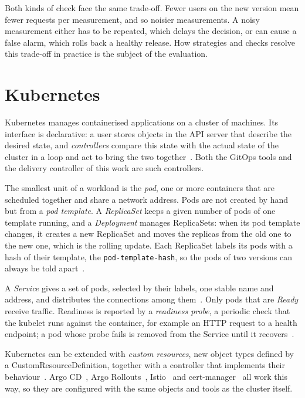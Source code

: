 Both kinds of check face the same trade-off. Fewer users on the new version mean fewer requests per measurement, and so noisier measurements. A noisy measurement either has to be repeated, which delays the decision, or can cause a false alarm, which rolls back a healthy release. How strategies and checks resolve this trade-off in practice is the subject of the evaluation.

\section{Kubernetes}
\label{sec:BgKubernetes}
Kubernetes manages containerised applications on a cluster of machines. Its interface is declarative: a user stores objects in the API server that describe the desired state, and \emph{controllers} compare this state with the actual state of the cluster in a loop and act to bring the two together~\cite{K8sControllers}. Both the GitOps tools and the delivery controller of this work are such controllers.

The smallest unit of a workload is the \emph{pod}, one or more containers that are scheduled together and share a network address. Pods are not created by hand but from a \emph{pod template}. A \emph{ReplicaSet} keeps a given number of pods of one template running, and a \emph{Deployment} manages ReplicaSets: when its pod template changes, it creates a new ReplicaSet and moves the replicas from the old one to the new one, which is the rolling update. Each ReplicaSet labels its pods with a hash of their template, the \texttt{pod-template-hash}, so the pods of two versions can always be told apart~\cite{K8sDeployment}.

A \emph{Service} gives a set of pods, selected by their labels, one stable name and address, and distributes the connections among them~\cite{K8sService}. Only pods that are \emph{Ready} receive traffic. Readiness is reported by a \emph{readiness probe}, a periodic check that the kubelet runs against the container, for example an HTTP request to a health endpoint; a pod whose probe fails is removed from the Service until it recovers~\cite{K8sProbes}.

Kubernetes can be extended with \emph{custom resources}, new object types defined by a CustomResourceDefinition, together with a controller that implements their behaviour~\cite{K8sCRD}. Argo CD~\cite{ArgoCD}, Argo Rollouts~\cite{ArgoRollouts}, Istio~\cite{IstioArchitecture} and cert-manager~\cite{CertManager} all work this way, so they are configured with the same objects and tools as the cluster itself.

